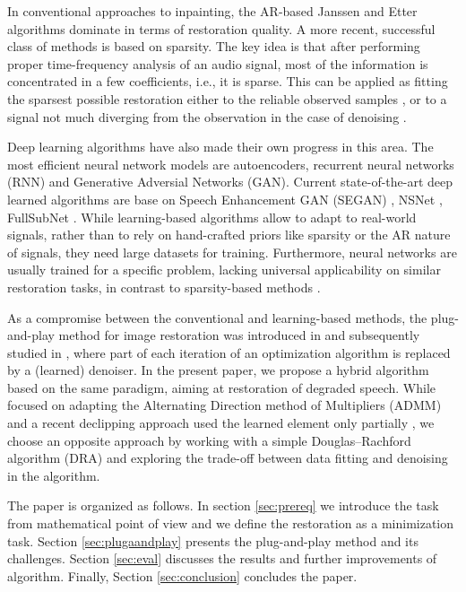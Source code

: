 \documentclass[conference]{IEEEtran}
\begin{document}
In conventional approaches to inpainting, the AR-based Janssen \cite{Janssen1986} and Etter~\cite{Etter1996} algorithms dominate in terms of restoration quality.
A more recent, successful class of methods is based on sparsity.
The key idea is that after performing proper time-frequency analysis of an audio signal,
most of the information is concentrated in a few coefficients, i.e., it is sparse.
This can be applied as fitting the sparsest possible restoration either to the reliable observed samples \cite{Adler2012, Kitic2015, Zaviska2019, Mokry2019}, or to a signal not much diverging from the observation in the case of denoising \cite{Kowalski2013}.

Deep learning algorithms have also made their own progress in this area.
The most efficient neural network models are autoencoders,
recurrent neural networks (RNN) and
Generative Adversial Networks (GAN).
Current state-of-the-art deep learned algorithms are base on Speech Enhancement GAN (SEGAN) \cite{Pascual2017}, NSNet \cite{Xia2020}, FullSubNet \cite{Hao2021}.
While learning-based algorithms allow to adapt to real-world signals, rather than to rely on hand-crafted priors like sparsity or the AR nature of signals, they need large datasets for training.
Furthermore, neural networks are usually trained for a specific problem, lacking universal applicability on similar restoration tasks, in contrast to sparsity-based methods \cite{Gaultier2017, Mokry202021, Zaviska2021}.

As a compromise between the conventional and learning-based methods, 
the plug-and-play method for image restoration was introduced in \cite{Venkatakrishnan2013} and subsequently studied in \cite{Chan2016},
where part of each iteration of an optimization algorithm is replaced by a (learned) denoiser.
In the present paper, we propose a hybrid algorithm based on the same paradigm, aiming at restoration of degraded speech.
While \cite{Chan2016} focused on adapting the Alternating Direction method of Multipliers (ADMM) and a recent declipping approach used the learned element only partially \cite{Tanaka2022}, we choose an opposite approach by working with a simple Douglas--Rachford algorithm (DRA) and exploring the trade-off between data fitting and denoising in the algorithm.


The paper is organized as follows. In section \ref{sec:prereq} we introduce the task from mathematical point of view and we define the restoration as a minimization task.
Section \ref{sec:plugaandplay} presents the plug-and-play method and its challenges.
Section \ref{sec:eval} discusses the results and further improvements of algorithm.
Finally, Section \ref{sec:conclusion} concludes the paper.
\end{document}
